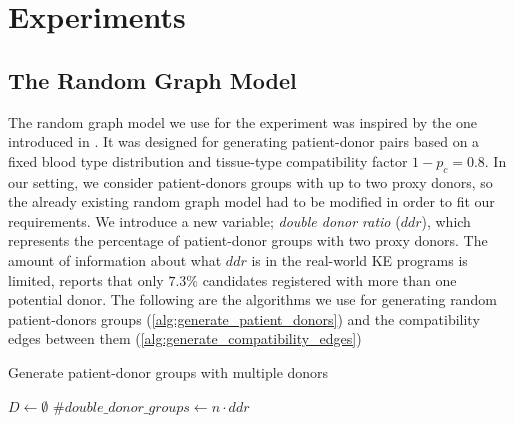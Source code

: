 \chapter{Experiments}
\label{cha:Experiments}


\section{The Random Graph Model}
The random graph model we use for the experiment was inspired by the one introduced in \cite{toulis2011random}. It was designed for generating patient-donor pairs based on a fixed blood type distribution and tissue-type compatibility factor $1 - p_c = 0.8$. In our setting, we consider patient-donors groups with up to two proxy donors, so the already existing random graph model had to be modified in order to fit our requirements. We introduce a new variable; \textit{double donor ratio} ($ddr$), which represents the percentage of patient-donor groups with two proxy donors. The amount of information about what $ddr$ is in the real-world KE programs is limited, \cite{holscher2018kidney} reports that only $7.3\%$ candidates registered with more than one potential donor. The following are the algorithms we use for generating random patient-donors groups (\autoref{alg:generate_patient_donors}) and the compatibility edges between them (\autoref{alg:generate_compatibility_edges})

\begin{algorithm}
    \caption{Generate patient-donor groups with multiple donors}
    \label{alg:generate_patient_donors}


    $D \gets \emptyset$\;
    $\#double\_donor\_groups \gets n \cdot ddr$\;
\end{algorithm}


